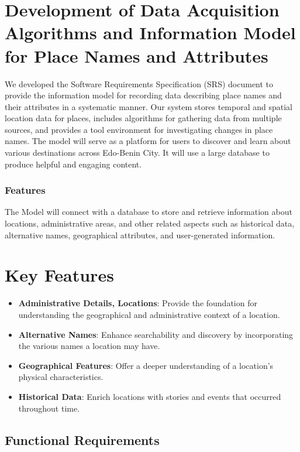 \section{Development of Data Acquisition Algorithms and Information Model for Place Names and Attributes}
We developed the Software Requirements Specification (SRS) document to provide the information model for recording data describing place names and their attributes in a systematic manner. Our system stores temporal and spatial location data for places, includes algorithms for gathering data from multiple sources, and provides a tool environment for investigating changes in place names.
The model will serve as a platform for users to discover and learn about various destinations across Edo-Benin City. It will use a large database to produce helpful and engaging content.
\subsubsection{Features}
The Model will connect with a database to store and retrieve information about locations, administrative areas, and other related aspects such as historical data, alternative names, geographical attributes, and user-generated information.

\section*{Key Features}

\begin{itemize}
    \item \textbf{Administrative Details, Locations}: Provide the foundation for understanding the geographical and administrative context of a location.
    \item \textbf{Alternative Names}: Enhance searchability and discovery by incorporating the various names a location may have.
    \item \textbf{Geographical Features}: Offer a deeper understanding of a location's physical characteristics.
    \item \textbf{Historical Data}: Enrich locations with stories and events that occurred throughout time.
\end{itemize}

\subsection*{Functional Requirements}

